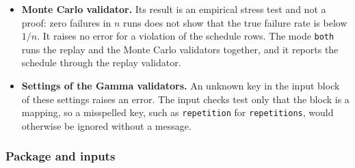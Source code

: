\documentclass[11pt,a4paper]{article}
\theoremstyle{plain}
\theoremstyle{definition}
\theoremstyle{remark}
\begin{document}
\begin{itemize}
\begin{itemize}
        Frequent repairs under $\text{ARD}_\infty$ make this ratio large, because each repair multiplies the rates of the repaired terms by $1/(1-\rho)$.
        Example: one term repaired $2$, $4$, $6$, $8$ and $10$ times at $\rho = 0.5$, beside a new term, needs $151$, $725$, about $3{,}000$, about $12{,}400$ and $49{,}884$ terms.
        One tail then takes about $2$\,s after $8$ repairs and about $31$\,s after~$10$.
        From $11$ repairs the series needs more than $100{,}000$ terms, the default limit, and the validator stops with an error.
      \item \textbf{Precision.} The series stops when the mixture weight that remains falls below the convolution tolerance, $10^{-12}$ by default.
        Its sums use the extended precision of NumPy, the numerical library of Python: $80$ bits on Linux, and the usual $64$ bits on Windows.
        With $80$ bits the series can reach a convolution tolerance near $10^{-19}$.
        With $64$ bits the remaining weight is understated by $2 \cdot 10^{-15}$ to $9 \cdot 10^{-15}$ after $2$, $4$ and $6$ repairs in the example above.
        This is about $1\,\%$ of the default convolution tolerance, and far below the default tolerance $10^{-8}$ with which a day passes.
        The convolution tolerance has no lower limit: a value that the series cannot reach ends in an error.
    \end{itemize}
  \item \textbf{Monte Carlo validator.} Its result is an empirical stress test and not a proof: zero failures in $n$ runs does not show that the true failure rate is below $1/n$.
    It raises no error for a violation of the schedule rows.
    The mode \texttt{both} runs the replay and the Monte Carlo validators together, and it reports the schedule through the replay validator.
  \item \textbf{Settings of the Gamma validators.} An unknown key in the input block of these settings raises an error.
    The input checks test only that the block is a mapping, so a misspelled key, such as \texttt{repetition} for \texttt{repetitions}, would otherwise be ignored without a message.
\end{itemize}

\subsubsection{Package and inputs}
\label{sec:impl_package}
\end{document}
